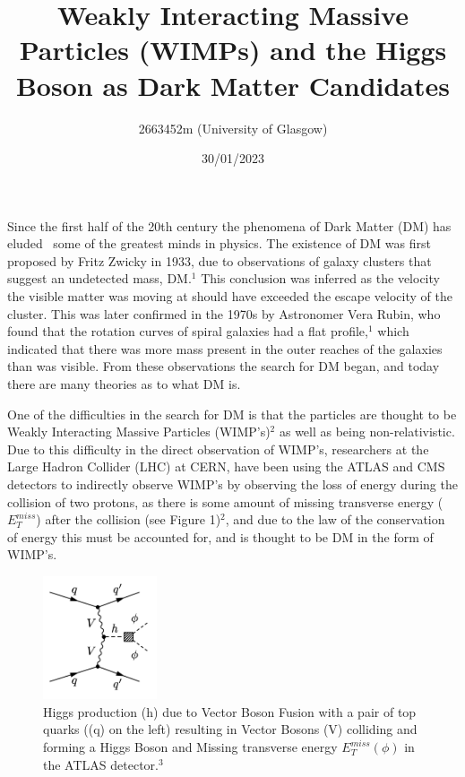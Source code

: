 \documentclass[]{article}
\title{\vspace{-8em}
\textbf{Weakly Interacting Massive Particles (WIMPs) 
and the Higgs Boson as Dark Matter Candidates }}
\author{2663452m (University of Glasgow)}
\date{30/01/2023}
\begin{document}
\maketitle
Since the first half of the 20th century the phenomena of Dark Matter (DM) has eluded \
some of the greatest minds in physics. The existence of DM was first 
proposed by Fritz Zwicky in 1933, due to observations of galaxy clusters that suggest
an undetected mass, DM.$^1$ This conclusion was inferred as the velocity the visible matter was
moving at should have exceeded the escape velocity of the cluster. 
This was later confirmed in the 1970s by Astronomer Vera Rubin, who found that
the rotation curves of spiral galaxies had a flat profile,$^1$ which indicated 
that there was more mass present in the outer reaches of the galaxies than 
was visible. From these observations the search for DM began, and today 
there are many theories as to what DM is.
\parskip 0.2cm


One of the difficulties in the search for DM is that the particles are thought 
to be Weakly Interacting Massive Particles (WIMP's)$^2$ as well as being non-relativistic.
Due to this difficulty in the direct observation of WIMP's, researchers
at the Large Hadron Collider (LHC) at CERN, have been using the ATLAS and CMS 
detectors to indirectly observe WIMP's by observing the loss of energy during the 
collision of two protons, as there is some amount of missing transverse energy ($E^{miss}_{T} $)
after the collision (see Figure 1)$^2$, and due to the law of the conservation of energy
this must be accounted for, and is thought to be DM in the form of WIMP's. 



\begin{figure}[h]
\centering  
\includegraphics[width=0.3\textwidth]{images/Feynman Diagrams of missing Tranverse energy.png}
\caption{Higgs production (h) due to Vector Boson Fusion with a pair of top quarks ((q) on the left) resulting in Vector Bosons (V) colliding and forming a Higgs Boson and Missing transverse energy $E^{miss}_{T} (\phi)$ in the ATLAS detector.$^3$}
\label{fig:missing_energy}
\end{figure}
\end{document}
